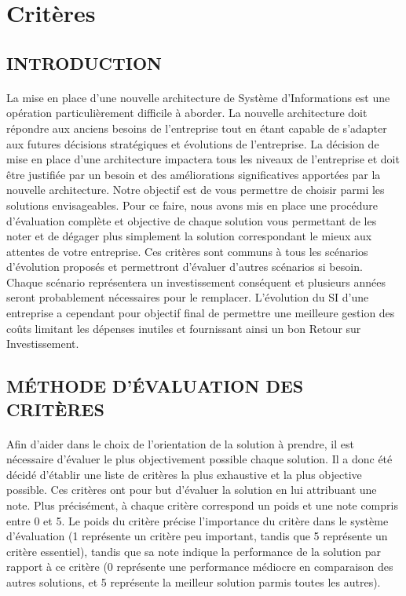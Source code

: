 \section{Critères}
\subsection{INTRODUCTION}

\paragraph{} La mise en place d'une nouvelle architecture de Système d'Informations est une opération particulièrement difficile à aborder. La nouvelle architecture doit répondre aux anciens besoins de l'entreprise tout en étant capable de s'adapter aux futures décisions stratégiques et évolutions de l'entreprise. La décision de mise en place d'une architecture impactera tous les niveaux de l'entreprise et doit être justifiée par un besoin et des améliorations significatives apportées par la nouvelle architecture. Notre objectif est de vous permettre de choisir parmi les solutions envisageables. Pour ce faire, nous avons mis en place une procédure d'évaluation complète et objective de chaque solution vous permettant de les noter et de dégager plus simplement la solution correspondant le mieux aux attentes de votre entreprise. Ces critères sont communs à tous les scénarios d'évolution proposés et permettront d'évaluer d'autres scénarios si besoin. Chaque scénario représentera un investissement conséquent et plusieurs années seront probablement nécessaires pour le remplacer. L'évolution du SI d'une entreprise a cependant pour objectif final de permettre une meilleure gestion des coûts limitant les dépenses inutiles et fournissant ainsi un bon Retour sur Investissement.

\subsection{MÉTHODE D'ÉVALUATION DES CRITÈRES}


\paragraph{} Afin d'aider dans le choix de l'orientation de la solution à prendre, il est nécessaire d'évaluer le plus objectivement possible chaque solution.
Il a donc été décidé d'établir une liste de critères la plus exhaustive et la plus objective possible.
Ces critères ont pour but d'évaluer la solution en lui attribuant une note. Plus précisément, à chaque critère correspond un poids et une note compris entre 0 et 5. Le poids du critère précise l'importance du critère dans le système d'évaluation (1 représente un critère peu important, tandis que 5 représente un critère essentiel), tandis que sa note indique la performance de la solution par rapport à ce critère (0 représente une performance médiocre en comparaison des autres solutions, et 5 représente la meilleur solution parmis toutes les autres).

